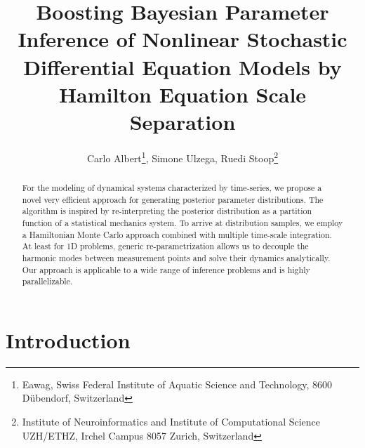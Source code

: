 \documentclass[11pt]{article}
\theoremstyle{definition}
\begin{document}
\title{Boosting Bayesian Parameter Inference of Nonlinear Stochastic Differential Equation Models by  Hamilton Equation Scale Separation }

\author{Carlo Albert\footnote{Eawag, Swiss Federal Institute of Aquatic Science and Technology, 8600 D\"ubendorf, Switzerland}, Simone Ulzega\footnotemark[1], Ruedi Stoop\footnote{Institute of Neuroinformatics and Institute of Computational Science UZH/ETHZ, Irchel Campus 8057 Zurich, Switzerland}}

\maketitle

\begin{abstract}
For the modeling of dynamical systems characterized by time-series, we propose a novel very efficient approach for generating posterior parameter distributions. The algorithm is inspired by re-interpreting the posterior distribution as a partition function of a 
statistical mechanics system. To arrive at distribution samples, we employ a Hamiltonian Monte Carlo approach combined with multiple time-scale integration.  
At least for 1D problems, generic re-parametrization allows us to decouple the harmonic modes between measurement points and solve their dynamics analytically. 
Our approach is applicable to a wide range of inference problems and is highly parallelizable. 


\end{abstract}


\section{Introduction}
\end{document}
